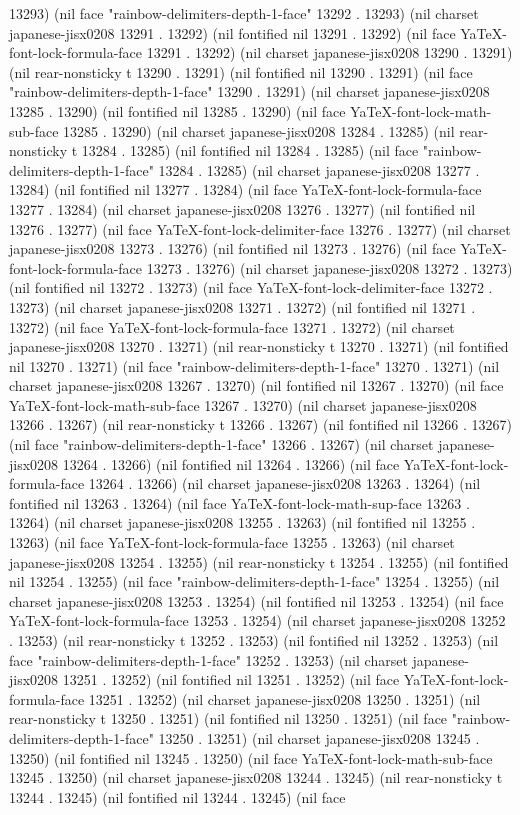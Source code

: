 13293) (nil face "rainbow-delimiters-depth-1-face" 13292 . 13293) (nil charset japanese-jisx0208 13291 . 13292) (nil fontified nil 13291 . 13292) (nil face YaTeX-font-lock-formula-face 13291 . 13292) (nil charset japanese-jisx0208 13290 . 13291) (nil rear-nonsticky t 13290 . 13291) (nil fontified nil 13290 . 13291) (nil face "rainbow-delimiters-depth-1-face" 13290 . 13291) (nil charset japanese-jisx0208 13285 . 13290) (nil fontified nil 13285 . 13290) (nil face YaTeX-font-lock-math-sub-face 13285 . 13290) (nil charset japanese-jisx0208 13284 . 13285) (nil rear-nonsticky t 13284 . 13285) (nil fontified nil 13284 . 13285) (nil face "rainbow-delimiters-depth-1-face" 13284 . 13285) (nil charset japanese-jisx0208 13277 . 13284) (nil fontified nil 13277 . 13284) (nil face YaTeX-font-lock-formula-face 13277 . 13284) (nil charset japanese-jisx0208 13276 . 13277) (nil fontified nil 13276 . 13277) (nil face YaTeX-font-lock-delimiter-face 13276 . 13277) (nil charset japanese-jisx0208 13273 . 13276) (nil fontified nil 13273 . 13276) (nil face YaTeX-font-lock-formula-face 13273 . 13276) (nil charset japanese-jisx0208 13272 . 13273) (nil fontified nil 13272 . 13273) (nil face YaTeX-font-lock-delimiter-face 13272 . 13273) (nil charset japanese-jisx0208 13271 . 13272) (nil fontified nil 13271 . 13272) (nil face YaTeX-font-lock-formula-face 13271 . 13272) (nil charset japanese-jisx0208 13270 . 13271) (nil rear-nonsticky t 13270 . 13271) (nil fontified nil 13270 . 13271) (nil face "rainbow-delimiters-depth-1-face" 13270 . 13271) (nil charset japanese-jisx0208 13267 . 13270) (nil fontified nil 13267 . 13270) (nil face YaTeX-font-lock-math-sub-face 13267 . 13270) (nil charset japanese-jisx0208 13266 . 13267) (nil rear-nonsticky t 13266 . 13267) (nil fontified nil 13266 . 13267) (nil face "rainbow-delimiters-depth-1-face" 13266 . 13267) (nil charset japanese-jisx0208 13264 . 13266) (nil fontified nil 13264 . 13266) (nil face YaTeX-font-lock-formula-face 13264 . 13266) (nil charset japanese-jisx0208 13263 . 13264) (nil fontified nil 13263 . 13264) (nil face YaTeX-font-lock-math-sup-face 13263 . 13264) (nil charset japanese-jisx0208 13255 . 13263) (nil fontified nil 13255 . 13263) (nil face YaTeX-font-lock-formula-face 13255 . 13263) (nil charset japanese-jisx0208 13254 . 13255) (nil rear-nonsticky t 13254 . 13255) (nil fontified nil 13254 . 13255) (nil face "rainbow-delimiters-depth-1-face" 13254 . 13255) (nil charset japanese-jisx0208 13253 . 13254) (nil fontified nil 13253 . 13254) (nil face YaTeX-font-lock-formula-face 13253 . 13254) (nil charset japanese-jisx0208 13252 . 13253) (nil rear-nonsticky t 13252 . 13253) (nil fontified nil 13252 . 13253) (nil face "rainbow-delimiters-depth-1-face" 13252 . 13253) (nil charset japanese-jisx0208 13251 . 13252) (nil fontified nil 13251 . 13252) (nil face YaTeX-font-lock-formula-face 13251 . 13252) (nil charset japanese-jisx0208 13250 . 13251) (nil rear-nonsticky t 13250 . 13251) (nil fontified nil 13250 . 13251) (nil face "rainbow-delimiters-depth-1-face" 13250 . 13251) (nil charset japanese-jisx0208 13245 . 13250) (nil fontified nil 13245 . 13250) (nil face YaTeX-font-lock-math-sub-face 13245 . 13250) (nil charset japanese-jisx0208 13244 . 13245) (nil rear-nonsticky t 13244 . 13245) (nil fontified nil 13244 . 13245) (nil face 